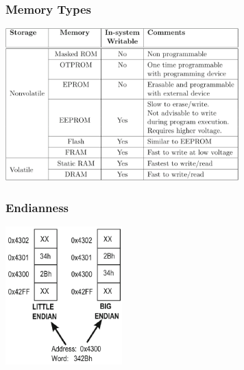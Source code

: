 \begin{multicols}{2}
\subsubsection{Memory Types}
\includegraphics[width=9cm]{images/memorytypes}

\subsubsection{Endianness}
\includegraphics[width=4.5cm]{images/be_le}
\end{multicols}

